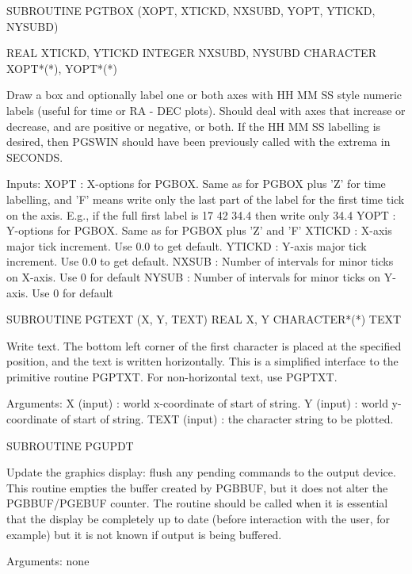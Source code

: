{\eightpoint\begintt
      SUBROUTINE PGTBOX (XOPT, XTICKD, NXSUBD, YOPT, YTICKD, NYSUBD)
 
      REAL XTICKD, YTICKD
      INTEGER NXSUBD, NYSUBD
      CHARACTER XOPT*(*), YOPT*(*)
 
Draw a box and optionally label one or both axes with HH MM SS style 
numeric labels (useful for time or RA - DEC plots). Should deal with 
axes that increase or decrease, and are positive or negative, or both.
If the HH MM SS labelling is desired, then PGSWIN should have been
previously called with the extrema in SECONDS.
 
Inputs:
 XOPT   :  X-options for PGBOX.  Same as for PGBOX plus 'Z' for time 
           labelling, and 'F' means write only the last part of the
           label for the first time tick on the axis.  E.g., if
           the full first label is 17 42 34.4 then write only 34.4
 YOPT   :  Y-options for PGBOX.  Same as for PGBOX plus 'Z' and 'F'
 XTICKD :  X-axis major tick increment.  Use 0.0 to get default. 
 YTICKD :  Y-axis major tick increment.  Use 0.0 to get default. 
 NXSUB  :  Number of intervals for minor ticks on X-axis. Use 0 for default
 NYSUB  :  Number of intervals for minor ticks on Y-axis. Use 0 for default
\endtt}

{\eightpoint\begintt
      SUBROUTINE PGTEXT (X, Y, TEXT)
      REAL X, Y
      CHARACTER*(*) TEXT
 
Write text. The bottom left corner of the first character is placed
at the specified position, and the text is written horizontally.
This is a simplified interface to the primitive routine PGPTXT.
For non-horizontal text, use PGPTXT.
 
Arguments:
 X      (input)  : world x-coordinate of start of string.
 Y      (input)  : world y-coordinate of start of string.
 TEXT   (input)  : the character string to be plotted.
\endtt}

{\eightpoint\begintt
      SUBROUTINE PGUPDT
 
Update the graphics display: flush any pending commands to the
output device. This routine empties the buffer created by PGBBUF,
but it does not alter the PGBBUF/PGEBUF counter. The routine should
be called when it is essential that the display be completely up to
date (before interaction with the user, for example) but it is not
known if output is being buffered.
 
Arguments: none
\endtt}

